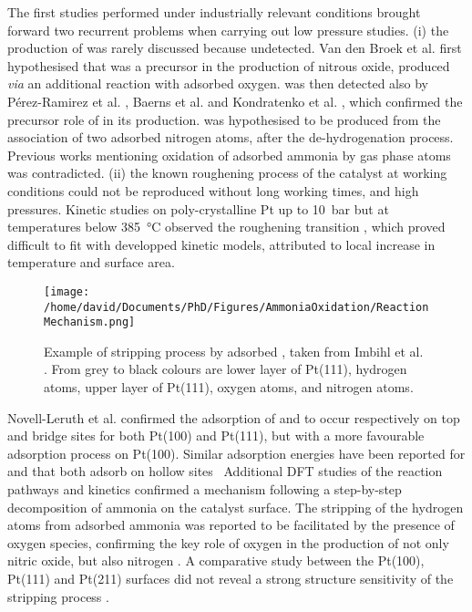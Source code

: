 The first studies performed under industrially relevant conditions brought forward two recurrent problems when carrying out low pressure studies.
(i) the production of  was rarely discussed because undetected.
Van den Broek et al. \parencite*{vandenBroek1999} first hypothesised that  was a precursor in the production of nitrous oxide, produced \textit{via} an additional reaction with adsorbed oxygen.
 was then detected also by Pérez-Ramirez et al. \parencite*{PerezRamirez2004}, Baerns et al. \parencite*{Baerns2005} and Kondratenko et al. \parencite*{Kondratenko2007}, which confirmed the precursor role of  in its production.
 was hypothesised to be produced from the association of two adsorbed nitrogen atoms, after the de-hydrogenation process.
Previous works mentioning oxidation of adsorbed ammonia by gas phase atoms was contradicted.
(ii) the known roughening process of the catalyst at working conditions could not be reproduced without long working times, and high pressures.
Kinetic studies on poly-crystalline Pt up to \qty{10}{\bar} but at temperatures below \qty{385}{\degreeCelsius} observed the roughening transition \parencite{Kraehnert2008}, which proved difficult to fit with developped kinetic models, attributed to local increase in temperature and surface area.

\begin{figure}[!htb]
    \centering
    \texttt{[image: /home/david/Documents/PhD/Figures/AmmoniaOxidation/ReactionMechanism.png]}
    \caption{
    Example of  stripping process by adsorbed , taken from Imbihl et al. \parencite*{Imbihl2007}.
    From grey to black colours are lower layer of Pt(111), hydrogen atoms, upper layer of Pt(111), oxygen atoms, and nitrogen atoms.
    }
    \label{fig:ReactionMechanism}
\end{figure}

Novell-Leruth et al. \parencite*{NovellLeruth2005} confirmed the adsorption of  and  to occur respectively on top and bridge sites for both Pt(100) and Pt(111), but with a more favourable adsorption process on Pt(100).
Similar adsorption energies have been reported for  and  that both adsorb on hollow sites \
Additional DFT studies of the reaction pathways and kinetics confirmed a mechanism following a step-by-step decomposition of ammonia on the catalyst surface.
The stripping of the hydrogen atoms from adsorbed ammonia was reported to be facilitated by the presence of oxygen species, confirming the key role of oxygen in the production of not only nitric oxide, but also nitrogen \parencite{Offermans2006}.
A comparative study between the Pt(100), Pt(111) and Pt(211) surfaces did not reveal a strong structure sensitivity of the \ce{NH_3} stripping process \parencite{Offermans2007}.


